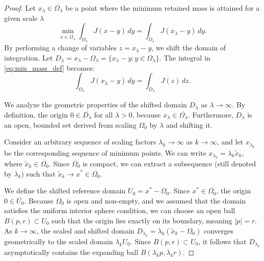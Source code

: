 \documentclass[12pt, a4paper]{article}
\theoremstyle{break}
\theoremstyle{break}
\theoremstyle{break}
\theoremstyle{break}
\theoremstyle{break}
\theoremstyle{break}
\theoremstyle{break}
\theoremstyle{break}
\theoremstyle{break}
\begin{document}
\begin{proof}
Let $x_\lambda \in \overline{\Omega_\lambda}$ be a point where the minimum retained mass is attained for a given scale $\lambda$
\begin{equation} \label{eq:min_mass_def}
    \min_{x \in \overline{\Omega_\lambda}} \int_{\Omega_\lambda} J(x-y) \, dy = \int_{\Omega_\lambda} J(x_\lambda - y) \, dy.
\end{equation}
By performing a change of variables $z = x_\lambda - y$, we shift the domain of integration. Let $D_\lambda = x_\lambda - \Omega_\lambda = \{ x_\lambda - y : y \in \Omega_\lambda \}$. The integral in \eqref{eq:min_mass_def} becomes:
\begin{equation}
    \int_{\Omega_\lambda} J(x_\lambda - y) \, dy = \int_{D_\lambda} J(z) \, dz.
\end{equation}

We analyze the geometric properties of the shifted domain $D_\lambda$ as $\lambda \to \infty$. By definition, the origin $0 \in \overline{D_\lambda}$ for all $\lambda > 0$, because $x_\lambda \in \overline{\Omega_\lambda}$. Furthermore, $D_\lambda$ is an open, bounded set derived from scaling $\Omega_0$ by $\lambda$ and shifting it. 

Consider an arbitrary sequence of scaling factors $\lambda_k \to \infty$ as $k \to \infty$, and let $x_{\lambda_k}$ be the corresponding sequence of minimum points. We can write $x_{\lambda_k} = \lambda_k \tilde{x}_k$, where $\tilde{x}_k \in \overline{\Omega_0}$. Since $\overline{\Omega_0}$ is compact, we can extract a subsequence (still denoted by $\lambda_k$) such that $\tilde{x}_k \to x^* \in \overline{\Omega_0}$.

We define the shifted reference domain $U_0 = x^* - \Omega_0$. Since $x^* \in \overline{\Omega_0}$, the origin $0 \in \overline{U_0}$. Because $\Omega_0$ is open and non-empty, and we assumed that the domain satisfies the uniform interior sphere condition, we can choose an open ball $B(p, r) \subset U_0$ such that the origin lies exactly on its boundary, meaning $|p| = r$. As $k \to \infty$, the scaled and shifted domain $D_{\lambda_k} = \lambda_k (\tilde{x}_k - \Omega_0)$ converges geometrically to the scaled domain $\lambda_k U_0$. Since $B(p, r) \subset U_0$, it follows that $D_{\lambda_k}$ asymptotically contains the expanding ball $B(\lambda_k p, \lambda_k r)$.


\end{proof}
\end{document}
